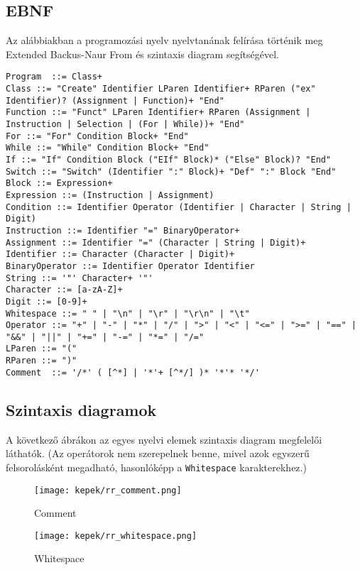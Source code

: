 \subsection{EBNF}

Az alábbiakban a programozási nyelv nyelvtanának felírása történik meg Extended Backus-Naur From és szintaxis diagram segítségével.

\begin{verbatim}
Program  ::= Class+
Class ::= "Create" Identifier LParen Identifier+ RParen ("ex" Identifier)? (Assignment | Function)+ "End"
Function ::= "Funct" LParen Identifier+ RParen (Assignment | Instruction | Selection | (For | While))+ "End"
For ::= "For" Condition Block+ "End"
While ::= "While" Condition Block+ "End"
If ::= "If" Condition Block ("EIf" Block)* ("Else" Block)? "End"
Switch ::= "Switch" (Identifier ":" Block)+ "Def" ":" Block "End"
Block ::= Expression+
Expression ::= (Instruction | Assignment)
Condition ::= Identifier Operator (Identifier | Character | String | Digit)
Instruction ::= Identifier "=" BinaryOperator+
Assignment ::= Identifier "=" (Character | String | Digit)+
Identifier ::= Character (Character | Digit)+
BinaryOperator ::= Identifier Operator Identifier
String ::= '"' Character+ '"'
Character ::= [a-zA-Z]+
Digit ::= [0-9]+
Whitespace ::= " " | "\n" | "\r" | "\r\n" | "\t"
Operator ::= "+" | "-" | "*" | "/" | ">" | "<" | "<=" | ">=" | "==" | "&&" | "||" | "+=" | "-=" | "*=" | "/="
LParen ::= "("
RParen ::= ")"
Comment  ::= '/*' ( [^*] | '*'+ [^*/] )* '*'* '*/'
\end{verbatim}

\subsection{Szintaxis diagramok}

A következő ábrákon az egyes nyelvi elemek szintaxis diagram megfelelői láthatók. (Az operátorok nem szerepelnek benne, mivel azok egyszerű felsorolásként megadható, hasonlóképp a \texttt{Whitespace} karakterekhez.)

\begin{figure}[h!]
\centering
\texttt{[image: kepek/rr\_comment.png]}
\caption{Comment}
\label{fig:rr_comment}
\end{figure}

\begin{figure}[h!]
\centering
\texttt{[image: kepek/rr\_whitespace.png]}
\caption{Whitespace}
\label{fig:rr_whitespace}
\end{figure}

